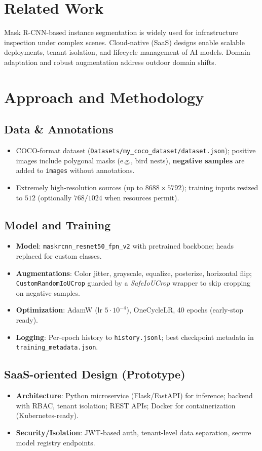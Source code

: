 \documentclass[11pt,a4paper]{article}
\begin{document}
\section{Related Work}
Mask R-CNN-based instance segmentation is widely used for infrastructure inspection under complex scenes. Cloud-native (SaaS) designs enable scalable deployments, tenant isolation, and lifecycle management of AI models. Domain adaptation and robust augmentation address outdoor domain shifts.

\section{Approach and Methodology}
\subsection{Data \& Annotations}
\begin{itemize}[leftmargin=*]
  \item COCO-format dataset (\verb|Datasets/my_coco_dataset/dataset.json|); positive images include polygonal masks (e.g., bird nests), \textbf{negative samples} are added to \texttt{images} without annotations.
  \item Extremely high-resolution sources (up to \(8688\times5792\)); training inputs resized to \(512\) (optionally \(768/1024\) when resources permit).
\end{itemize}

\subsection{Model and Training}
\begin{itemize}[leftmargin=*]
  \item \textbf{Model}: \texttt{maskrcnn\_resnet50\_fpn\_v2} with pretrained backbone; heads replaced for custom classes.
  \item \textbf{Augmentations}: Color jitter, grayscale, equalize, posterize, horizontal flip; \texttt{CustomRandomIoUCrop} guarded by a \emph{SafeIoUCrop} wrapper to skip cropping on negative samples.
  \item \textbf{Optimization}: AdamW (lr \(5\cdot10^{-4}\)), OneCycleLR, 40 epochs (early-stop ready).
  \item \textbf{Logging}: Per-epoch history to \texttt{history.jsonl}; best checkpoint metadata in \texttt{training\_metadata.json}.
\end{itemize}

\subsection{SaaS-oriented Design (Prototype)}
\begin{itemize}[leftmargin=*]
  \item \textbf{Architecture}: Python microservice (Flask/FastAPI) for inference; backend with RBAC, tenant isolation; REST APIs; Docker for containerization (Kubernetes-ready).
  \item \textbf{Security/Isolation}: JWT-based auth, tenant-level data separation, secure model registry endpoints.
\end{itemize}
\end{document}
